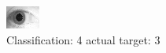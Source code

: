 \begin{figure}[h!]
\begin{center}
\includegraphics[width=0.60\columnwidth]{figures/ID1854_class_4_target_3.png}
\end{center}
\caption{ Classification: 4 actual target: 3}
\label{fig:ID1854_class_4_target_3}
\end{figure}

